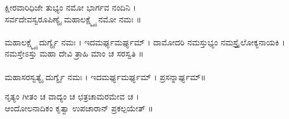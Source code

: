 ಕ್ಷೀರವಾರಿಧಿಜೇ ತುಭ್ಯಂ ನಮೋ ಭಾರ್ಗವ ನಂದಿನಿ ।\\
ಸರ್ವದೇವಸ್ವರೂಪಿಣ್ಯೈ ಮಹಾಲಕ್ಷ್ಮ್ಯೈ ನಮೋ ನಮಃ ॥ \\
\\
ಮಹಾಲಕ್ಷ್ಮ್ಯೈ ದುರ್ಗ್ಯೈ ನಮಃ । ಇದಮರ್ಘ್ಯಮರ್ಘ್ಯಮ್ ।
\newpage
ದಾಮೋದರಿ ನಮಸ್ತುಭ್ಯಂ ನಮಸ್ತ್ರೈಲೋಕ್ಯನಾಯಕಿ ।\\
ನಮಸ್ತೇಽಸ್ತು ಮಹಾ ದೇವಿ ತ್ರಾಹಿ ಮಾಂ ಚ ಸರಸ್ವತಿ ॥\\
\\
ಮಹಾಸರಸ್ವತ್ಯೈ ದುರ್ಗ್ಯೈ ನಮಃ । ಇದಮರ್ಘ್ಯಮರ್ಘ್ಯಮ್ ।
ಪ್ರಸನ್ನಾರ್ಘ್ಯಮ್॥

ನೃತ್ಯಂ ಗೀತಂ ಚ ವಾದ್ಯಂ ಚ ಛತ್ರಚಾಮರಮೇವ ಚ ।\\
ಆಂದೋಲನಾದಿಕಂ ಕೃತ್ವಾ ಉಪಚಾರಾನ್ ಪ್ರಕಲ್ಪಯೇತ್ ॥
